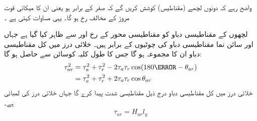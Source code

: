 واضح رہے کہ  دونوں لچھے (مقناطیس) کوشش کریں گے کہ  صفر کے برابر ہو یعنی ان کا میکانی قوت مروڑ   کے مخالف رخ ہو گا۔ یہی مساوات   کہتی  ہے ۔

لچھوں  کے مقناطیسی دباو کو  مقناطیسی محور کے رخ   اور  سے ظاہر کیا گیا ہے  جہاں  اور  سائن نما مقناطیسی دباو کی چوٹیوں کے برابر ہیں۔   خلائی درز میں کل مقناطیسی دباو  ان  کا مجموعہ ہو گا جس کا طول  کلیہ کوسائن   سے حاصل ہو گا:
\begin{gather}
\begin{aligned}\label{مساوات_گھومتے_مشین_مربع_کل_دباو}
\tau_{ar}^2&=\tau_a^2+\tau_r^2-2\tau_a \tau_r \cos (180\degree-\theta_{ar})\\
&=\tau_a^2+\tau_r^2+2\tau_a \tau_r \cos \theta_{ar}
\end{aligned}
\end{gather}
خلائی درز میں کل مقناطیسی دباو  درج ذیل مقناطیسی شدت  پیدا کرے گا جہاں  خلائی درز کی لمبائی ہے۔
\begin{align}
\tau_{ar}=H_{ar} l_g
\end{align}


